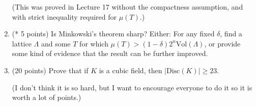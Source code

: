 \documentclass[12pt]{article}
\begin{document}
\begin{enumerate}
(This was proved in Lecture 17 without the compactness assumption, and with strict inequality
required for $\mu(T)$.)

\item (* 5 points)
Is Minkowski's theorem sharp? Either: For any fixed $\delta$, find a lattice $\Lambda$
and some $T$ for which $\mu(T) > (1 - \delta) 2^n {\textrm{Vol}}(\Lambda)$, or provide
some kind of evidence that the result can be further improved.

\item (20 points)
Prove that if $K$ is a cubic field, then $|{\textrm{Disc}}(K)| \geq 23$.

(I don't think it is so hard, but I want to encourage everyone to do it so it is worth a lot of
points.)

\end{enumerate}
\end{document}
